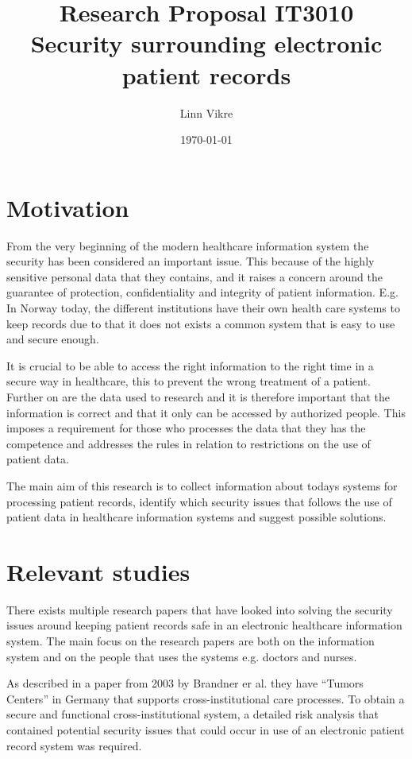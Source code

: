 \documentclass[11pt, a4paper]{article}
\title{Research Proposal IT3010\\ Security surrounding electronic patient records}
\author{Linn Vikre}
\date{\today}
\begin{document}
\maketitle
\section{Motivation}
From the very beginning of the modern healthcare information system the security has been considered an important issue. This because of the highly sensitive personal data\cite{personopplysningsloven201104} that they contains, and it raises a concern around the guarantee of protection, confidentiality and integrity of patient information\cite{Smith199939}. E.g. In Norway today, the different institutions have their own health care systems to keep records due to that it does not exists a common system that is easy to use and secure enough.

It is crucial to be able to access the right information to the right time in a secure way in healthcare, this to prevent the wrong treatment of a patient. Further on are the data used to research and it is therefore important that the information is correct and that it only can be accessed by authorized people. This imposes a requirement for those who processes the data that they has the competence and addresses the rules in relation to restrictions on the use of patient data\cite{faxvaag2007er}.

The main aim of this research is to collect information about todays systems for processing patient records, identify which security issues that follows the use of patient data in healthcare information systems and suggest possible solutions.

\section{Relevant studies}

There exists multiple research papers that have looked into solving the security issues around keeping patient records safe in an electronic healthcare information system. The main focus on the research papers are both on the information system and on the people that uses the systems e.g. doctors and nurses.

As described in a paper from 2003 by Brandner er al.\cite{van2003data} they have “Tumors Centers” in Germany that supports cross-institutional care processes. To obtain a secure and functional cross-institutional system, a detailed risk analysis that contained potential security issues that could occur in use of an electronic patient record system was required.
\end{document}
